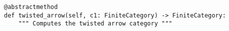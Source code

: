 \begin{verbatim}
@abstractmethod
def twisted_arrow(self, c1: FiniteCategory) -> FiniteCategory:
    """ Computes the twisted arrow category """
\end{verbatim}